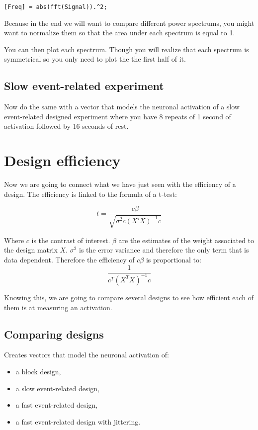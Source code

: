\documentclass[a4paper,10pt]{article}
\begin{document}
\begin{verbatim}
[Freq] = abs(fft(Signal)).^2;
\end{verbatim}

Because in the end we will want to compare different power spectrums, you might want to normalize them so that the area under each spectrum is equal to 1.

You can then plot each spectrum. Though you will realize that each spectrum is symmetrical so you only need to plot the the first half of it.


\subsection{Slow event-related experiment}

Now do the same with a vector that models the neuronal activation of a slow event-related designed experiment where you have 8 repeats of 1 second of activation followed by 16 seconds of rest.



\section{Design efficiency}

Now we are going to connect what we have just seen with the efficiency of a design. The efficiency is linked to the formula of a t-test:

\begin{displaymath}
 t = \frac{c \beta}{\sqrt{ \sigma{^2}  c  (X'X)^{-1}  c}}
\end{displaymath}

Where $c$ is the contrast of interest. $\beta$ are the estimates of the weight associated to the design matrix $X$. $\sigma{^2}$ is the error variance and therefore the only term that is data dependent.
Therefore the efficiency of $c\beta$ is proportional to:
\begin{displaymath}
\frac{1}{ c^{T}  (X^{T}X)^{-1}  c}
\end{displaymath}

Knowing this, we are going to compare several designs to see how efficient each of them is at measuring an activation.


\subsection{Comparing designs}

Creates vectors that model the neuronal activation of:
\begin{itemize}
 \item a block design,
 \item a slow event-related design,
 \item a fast event-related design,
 \item a fast event-related design with jittering.
\end{itemize}
\end{document}
